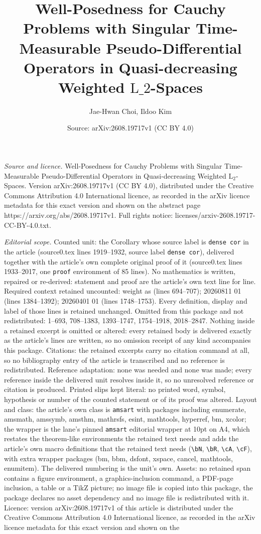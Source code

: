 \documentclass[10pt,a4paper]{amsart}
\title[Well-Posedness for Cauchy Problems with Singular Time-Measur]{Well-Posedness for Cauchy Problems with Singular Time-Measurable Pseudo-Differential Operators in Quasi-decreasing Weighted $\mathrm{L}\_2$-Spaces}
\author{Jae-Hwan Choi, Ildoo Kim}
\date{Source: arXiv:2608.19717v1 (CC BY 4.0)}
\begin{document}
\maketitle

\noindent\emph{Source and licence.} Well-Posedness for Cauchy Problems with Singular Time-Measurable Pseudo-Differential Operators in Quasi-decreasing Weighted $\mathrm{L}_2$-Spaces. Version arXiv:2608.19717v1 (CC BY 4.0), distributed under the Creative Commons Attribution 4.0 International licence, as recorded in the arXiv licence metadata for this exact version and shown on the abstract page https://arxiv.org/abs/2608.19717v1. Full rights notice: licenses/arxiv-2608.19717-CC-BY-4.0.txt.\par\smallskip

\noindent\textit{Editorial scope.} Counted unit: the Corollary whose source label is \texttt{dense cor} in the article (source0.tex lines 1919--1932, source label \texttt{dense cor}), delivered together with the article's own complete original proof of it (source0.tex lines 1933--2017, one \texttt{proof} environment of 85 lines). No mathematics is written, repaired or re-derived: statement and proof are the article's own text line for line. Required context retained uncounted: weight as (lines 694--707); 20260811 01 (lines 1384--1392); 20260401 01 (lines 1748--1753). Every definition, display and label of those lines is retained unchanged. Omitted from this package and not redistributed: 1--693, 708--1383, 1393--1747, 1754--1918, 2018--2847. Nothing inside a retained excerpt is omitted or altered: every retained body is delivered exactly as the article's lines are written, so no omission receipt of any kind accompanies this package. Citations: the retained excerpts carry no citation command at all, so no bibliography entry of the article is transcribed and no reference is redistributed. Reference adaptation: none was needed and none was made; every reference inside the delivered unit resolves inside it, so no unresolved reference or citation is produced. Printed slips kept literal: no printed word, symbol, hypothesis or number of the counted statement or of its proof was altered. Layout and class: the article's own class is \texttt{amsart} with packages including enumerate, amsmath, amssymb, amsthm, mathrsfs, esint, mathtools, hyperref, bm, xcolor; the wrapper is the lane's pinned \texttt{amsart} editorial wrapper at 10pt on A4, which restates the theorem-like environments the retained text needs and adds the article's own macro definitions that the retained text needs (\texttt{\textbackslash bN}, \texttt{\textbackslash bR}, \texttt{\textbackslash cA}, \texttt{\textbackslash cF}), with extra wrapper packages (bm, bbm, dsfont, xspace, cancel, mathtools, enumitem). The delivered numbering is the unit's own. Assets: no retained span contains a figure environment, a graphics-inclusion command, a PDF-page inclusion, a table or a TikZ picture; no image file is copied into this package, the package declares no asset dependency and no image file is redistributed with it. Licence: version arXiv:2608.19717v1 of this article is distributed under the Creative Commons Attribution 4.0 International licence, as recorded in the arXiv licence metadata for this exact version and shown on the 
\end{document}
